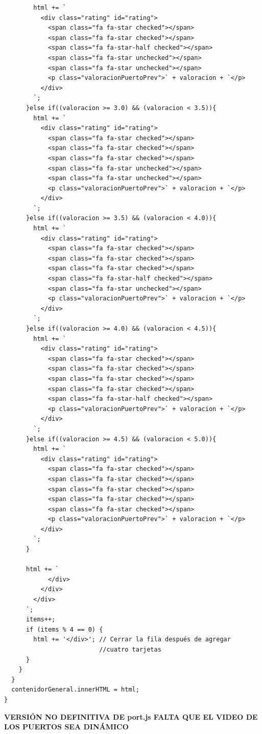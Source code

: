 \documentclass{article}
\begin{document}
\begin{itemize}
\begin{verbatim}
        html += `
          <div class="rating" id="rating">
            <span class="fa fa-star checked"></span>
            <span class="fa fa-star checked"></span>
            <span class="fa fa-star-half checked"></span>
            <span class="fa fa-star unchecked"></span>
            <span class="fa fa-star unchecked"></span>
            <p class="valoracionPuertoPrev">` + valoracion + `</p>
          </div>
        `;
      }else if((valoracion >= 3.0) && (valoracion < 3.5)){
        html += `
          <div class="rating" id="rating">
            <span class="fa fa-star checked"></span>
            <span class="fa fa-star checked"></span>
            <span class="fa fa-star checked"></span>
            <span class="fa fa-star unchecked"></span>
            <span class="fa fa-star unchecked"></span>
            <p class="valoracionPuertoPrev">` + valoracion + `</p>
          </div>
        `;
      }else if((valoracion >= 3.5) && (valoracion < 4.0)){
        html += `
          <div class="rating" id="rating">
            <span class="fa fa-star checked"></span>
            <span class="fa fa-star checked"></span>
            <span class="fa fa-star checked"></span>
            <span class="fa fa-star-half checked"></span>
            <span class="fa fa-star unchecked"></span>
            <p class="valoracionPuertoPrev">` + valoracion + `</p>
          </div>
        `;
      }else if((valoracion >= 4.0) && (valoracion < 4.5)){
        html += `
          <div class="rating" id="rating">
            <span class="fa fa-star checked"></span>
            <span class="fa fa-star checked"></span>
            <span class="fa fa-star checked"></span>
            <span class="fa fa-star checked"></span>
            <span class="fa fa-star-half checked"></span>
            <p class="valoracionPuertoPrev">` + valoracion + `</p>
          </div>
        `;
      }else if((valoracion >= 4.5) && (valoracion < 5.0)){
        html += `
          <div class="rating" id="rating">
            <span class="fa fa-star checked"></span>
            <span class="fa fa-star checked"></span>
            <span class="fa fa-star checked"></span>
            <span class="fa fa-star checked"></span>
            <span class="fa fa-star checked"></span>
            <p class="valoracionPuertoPrev">` + valoracion + `</p>
          </div>
        `;
      }

      html += `
            </div>
          </div>
        </div>
      `;
      items++;
      if (items % 4 == 0) {
        html += '</div>'; // Cerrar la fila después de agregar 
                          //cuatro tarjetas
      }
    }
  }
  contenidorGeneral.innerHTML = html;
}
    \end{verbatim}

\end{itemize}
\textbf{VERSIÓN NO DEFINITIVA DE port.js FALTA QUE EL VIDEO DE LOS PUERTOS SEA DINÁMICO}
\end{document}
